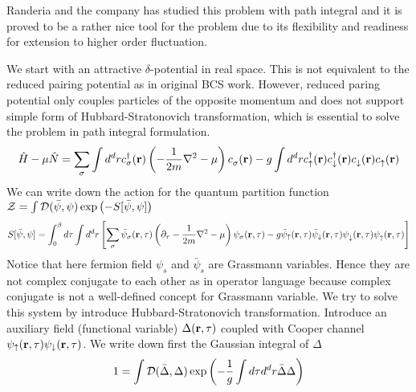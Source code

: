 \label{sec:pathInt}
Randeria and the company has studied this problem with path integral and it is proved to be a rather nice tool for the problem due to its flexibility and readiness for extension to higher order fluctuation.  

We start with an attractive $\delta$-potential in real space.  This is not equivalent to the  reduced pairing potential as in original BCS work.  However, reduced paring potential only couples  particles of the opposite momentum and does not support simple form of Hubbard-Stratonovich transformation, which is essential to solve the problem in path integral formulation.  
\begin{equation}
\hat{H}-\mu\hat{N}=\sum_{\sigma}\int{d^{d}r}c^{\dagger}_{\sigma}(\mathbf{r})\left(-\frac{1}{2m}\nabla^{2}-\mu\right)c^{}_{\sigma}(\mathbf{r})-g\int{d^{d}r}c^{\dagger}_{\uparrow}(\mathbf{r})c^{\dagger}_{\downarrow}(\mathbf{r})c^{}_{\downarrow}(\mathbf{r})c^{}_{\uparrow}(\mathbf{r})
\end{equation}
 We can write down the action for the quantum partition function $\mathcal{Z}=\int{\ensuremath{\mathcal{D}}(\bar\psi,\psi)\exp\ensuremath{\left(-S[\bar\psi,\psi]\right)}}$
\begin{equation}\label{eq:pathInt2:actionPsi}
S[\bar\psi,\psi]=\int^{\beta}_{0}d\tau\int{d^{d}r}\left[\sum_{\sigma}\bar\psi_{\sigma}(\mathbf{r},\tau)\left(\partial_{\tau}-\frac{1}{2m}\nabla^{2}-\mu\right)\psi_{\sigma}(\mathbf{r},\tau)-g\bar\psi_{\uparrow}(\mathbf{r},\tau)\bar\psi_{\downarrow}(\mathbf{r},\tau)\psi^{}_{\downarrow}(\mathbf{r},\tau)\psi^{}_{\uparrow}(\mathbf{r},\tau)\right]
\end{equation}
Notice that here fermion field $\psi_{s}$ and $\bar\psi_{s}$ are Grassmann variables. Hence  they are not complex conjugate to each other as in operator language because  complex conjugate is not a well-defined concept for Grassmann variable. 
We try to solve this system by introduce Hubbard-Stratonovich transformation.   Introduce an auxiliary field (functional variable) $\Delta(\mathbf{r},\tau)$ coupled with Cooper channel $\psi_{\uparrow}(\mathbf{r},\tau)\psi_{\downarrow}(\mathbf{r},\tau)$. %
We write down first the Gaussian integral of $\Delta$
\begin{equation}
1=\int{\ensuremath{\mathcal{D}}(\bar\Delta,\Delta)}\exp\left(-\frac{1}{g}\int{d\tau{d}^{d}r}\bar\Delta\Delta\right)
\end{equation}
